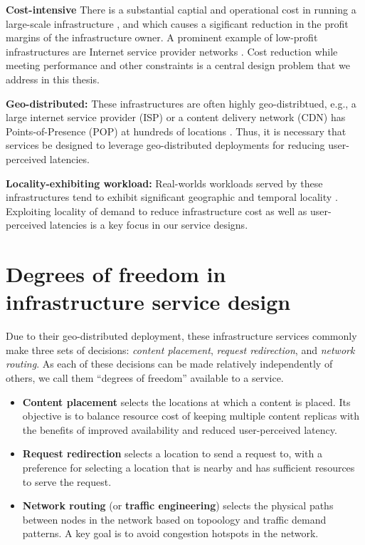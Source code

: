 \textbf{Cost-intensive} There is a substantial captial and operational cost in running a large-scale infrastructure \cite{greenberg2008cost}, and which causes a sigificant reduction in the profit margins of the infrastructure owner. A prominent example of low-profit infrastructures are Internet service provider networks \cite{isp-low-profit}. Cost reduction while meeting performance and other constraints is a central design problem that we address in this thesis. 

\textbf{Geo-distributed:} These infrastructures are often highly geo-distribtued, e.g., a large internet service provider (ISP) or a content delivery network (CDN) has Points-of-Presence (POP) at hundreds of locations \cite{dilley2002globally}. Thus, it is necessary that services be designed to leverage geo-distributed deployments for reducing user-perceived latencies.

\textbf{Locality-exhibiting workload:} Real-worlds workloads served by these infrastructures tend to exhibit significant geographic and temporal locality \cite{NCDN, youtubeUGC, vodP2Pbenefit, cellularvideotraffic}. Exploiting locality of demand to reduce infrastructure cost as well as user-perceived latencies is a key focus in our service designs.

\section{Degrees of freedom in infrastructure service design} 

Due to their geo-distributed deployment, these infrastructure services commonly make three sets of decisions: \emph{content placement}, \emph{request redirection}, and \emph{network routing}. As each of these decisions can be made relatively independently of others, we call them ``degrees of freedom'' available to a service.

\begin{itemize}
	\item
	\textbf{Content placement} selects the locations at which a content is placed. Its objective  is to balance resource cost of keeping multiple content replicas with the benefits of improved availability and reduced user-perceived latency.
	\item
	\textbf{Request redirection} selects a location to send a request to, with a preference for selecting a location that is nearby and has sufficient resources to serve the request.
	\item
	\textbf{Network routing} (or \textbf{traffic engineering}) selects the physical paths between nodes in the network based on topoology and traffic demand patterns. A key goal is to avoid congestion hotspots in the network.
\end{itemize}


